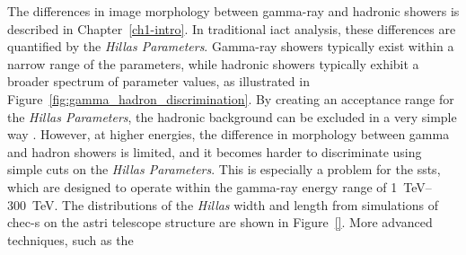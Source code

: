 The differences in image morphology between gamma-ray and hadronic showers is described in Chapter~\ref{ch1-intro}. In traditional \gls{iact} analysis, these differences are quantified by the \textit{Hillas Parameters}. Gamma-ray showers typically exist within a narrow range of the parameters, while hadronic showers typically exhibit a broader spectrum of parameter values, as illustrated in Figure~\ref{fig:gamma_hadron_discrimination}. By creating an acceptance range for the \textit{Hillas Parameters}, the hadronic background can be excluded in a very simple way \cite{Dickinson2010,Fegan1999a,Hillas1996a}. However, at higher energies, the difference in morphology between gamma and hadron showers is limited, and it becomes harder to discriminate using simple cuts on the \textit{Hillas Parameters}. This is especially a problem for the \glspl{sst}, which are designed to operate within the gamma-ray energy range of \SIrange{1}{300}{TeV}. The distributions of the \textit{Hillas} width and length from simulations of \gls{chec-s} on the \gls{astri} telescope structure are shown in Figure~\ref{}. More advanced techniques, such as the 
